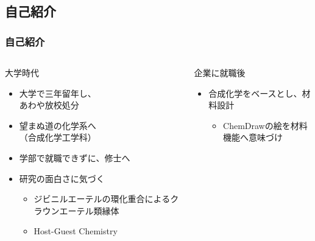 \documentclass[12pt, dvipdfmx]{beamer}
\begin{document}
\subsection{自己紹介}
\begin{frame}
	\frametitle{自己紹介}
    \vspace{-3mm}
        \begin{columns}[T, onlytextwidth]
                \begin{block}{大学時代}
                    \begin{itemize}
                        \item 大学で三年留年し、\\あわや放校処分
                        \item 望まぬ道の化学系へ\\（合成化学工学科）
                        \item 学部で就職できずに、修士へ
                        \item 研究の面白さに気づく
                        \begin{itemize}
                            \item ジビニルエーテルの環化重合によるクラウンエーテル類縁体
                            \item Host-Guest Chemistry
                        \end{itemize}
                    \end{itemize}
                \end{block}
                \begin{exampleblock}{企業に就職後}
                    \begin{itemize}
                        \item 合成化学をベースとし、材料設計
                        \begin{itemize}
                            \item ChemDrawの絵を材料機能へ意味づけ

\end{itemize}
\end{itemize}
\end{exampleblock}
\end{columns}
\end{frame}
\end{document}
